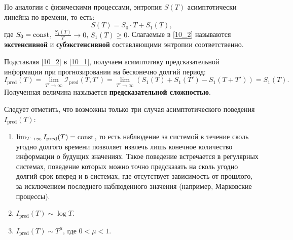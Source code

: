 По аналогии с физическими процессами, %
энтропия $S(T)$ асимптотически линейна по времени, то есть:
\begin{equation}
\label{10_2}
    S(T) = S_0 \cdot T + S_1(T),
\end{equation}
где $S_0 = \mathrm{const}$, $\frac{S_1(T)}{T} \to 0$, $S_1(T) \ge 0$.
Слагаемые в \eqref{10_2} называются \textbf{экстенсивной} и \textbf{субэкстенсивной} составляющими энтропии соответственно.

Подставляя \eqref{10_2} в \eqref{10_1}, получаем асимптотику предсказательной информации при прогнозировании на бесконечно долгий период:
\begin{equation*}
    I_{\text{pred}}(T) =
    \lim_{T' \to\infty} \mathcal{I}_{\text{pred}}\left( T, T' \right) =
    \lim_{T' \to\infty} \left( S_1(T) + S_1(T') - S_1(T+T') \right) =
    S_1(T).
\end{equation*}
Полученная величина называется \textbf{предсказательной сложностью}.

Следует отметить, что возможны только три случая асимптотического поведения $I_{\text{pred}}(T)$:
\begin{enumerate}
\item
    $\lim_{T \to \infty} I_{\text{pred}}(T) = \mathrm{const}$, то есть наблюдение за системой в течение сколь угодно долгого времени позволяет извлечь лишь конечное количество информации о будущих значениях.
    Такое поведение встречается в регулярных системах, поведение которых можно точно предсказать на сколь угодно долгий срок вперед и в системах, где отсутствует зависимость от прошлого, за исключением последнего наблюденного значения (например, Марковские процессы).
\item
    $I_{\text{pred}}(T) \sim \log T$.
\item
    $I_{\text{pred}}(T) \sim T^{\mu}$, где $0 < \mu < 1$.
\end{enumerate}


